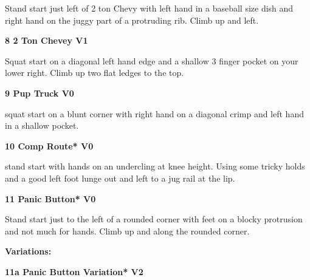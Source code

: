 \begin{multicols}{2}
\begin{minipage}{\linewidth}
					\begin{adjustwidth}{0.5cm}{}				
					Stand start just left of 2 ton Chevy with left hand in a baseball size dish and right hand on the juggy part of a protruding rib. Climb up and left.
					\end{adjustwidth}
					\end{minipage}
					\begin{minipage}{\linewidth}	
					\label{rt:2 Ton Chevey}
\colorbox{green!20}{
\textbf{
8 2 Ton Chevey V1    
}
}

					\begin{adjustwidth}{0.5cm}{}				
					Squat start on a diagonal left hand edge and a shallow 3 finger pocket on your lower right. Climb up two flat ledges to the top.
					\end{adjustwidth}
					\end{minipage}
					\begin{minipage}{\linewidth}	
					\label{rt:Pup Truck}
\colorbox{green!20}{
\textbf{
9 Pup Truck V0    
}
}

					\begin{adjustwidth}{0.5cm}{}				
					squat start on a blunt corner with right hand on a diagonal crimp and left hand in a shallow pocket.
					\end{adjustwidth}
					\end{minipage}

					\begin{minipage}{\linewidth}	
					\label{rt:Comp Route}
\colorbox{green!20}{
\textbf{
10 Comp Route* V0   
}
}

					\begin{adjustwidth}{0.5cm}{}				
					stand start with hands on an undercling at knee height. Using some tricky holds and a good left foot lunge out and left to a jug rail at the lip.
					\end{adjustwidth}
					\end{minipage}
					\begin{minipage}{\linewidth}	
					\label{rt:Panic Button}
\colorbox{green!20}{
\textbf{
11 Panic Button* V0   
}
}

					\begin{adjustwidth}{0.5cm}{}				
					Stand start just to the left of a rounded corner with feet on a blocky protrusion and not much for hands. Climb up and along the rounded corner.
					\end{adjustwidth}
					\end{minipage}
						\begin{adjustwidth}{0.5cm}{}				
						\textbf{Variations:} \newline
							\begin{minipage}{\linewidth}	
							\label{vr:Panic Button Variation}
\colorbox{green!20}{
\textbf{
11a Panic Button Variation* V2    
}
}


\end{minipage}
\end{adjustwidth}
\end{multicols}
